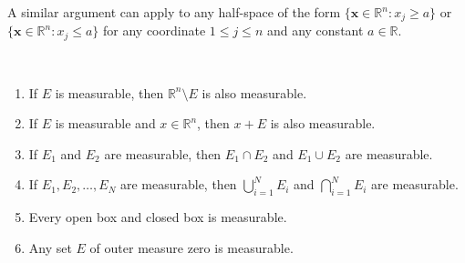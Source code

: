 \begin{remark}
    A similar argument can apply to any half-space of the form $\{\mathbf{x} \in \mathbb{R}^n : x_j \ge a\}$ or $\{\mathbf{x} \in \mathbb{R}^n : x_j \le a\}$ for any coordinate $1 \le j \le n$ and any constant $a \in \mathbb{R}$.
\end{remark}

\begin{theorem}\ \vspace{-1em}
    \begin{enumerate}
        \item[(a)] If $E$ is measurable, then $\mathbb{R}^n \setminus E$ is also measurable.
        \item[(b)] If $E$ is measurable and $x \in \mathbb{R}^n$, then $x+E$ is also measurable.
        \item[(c)] If $E_1$ and $E_2$ are measurable, then $E_1 \cap E_2$ and $E_1 \cup E_2$ are measurable.
        \item[(d)] If $E_1, E_2, \dots, E_N$ are measurable, then $\bigcup_{i=1}^N E_i$ and $\bigcap_{i=1}^N E_i$ are measurable.
        \item[(e)] Every open box and closed box is measurable.
        \item[(f)] Any set $E$ of outer measure zero is measurable.
    \end{enumerate}
\end{theorem}

